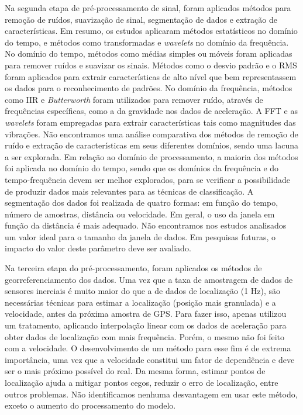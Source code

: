 Na segunda etapa de pré-processamento de sinal, foram aplicados métodos para remoção de ruídos, suavização de sinal, segmentação de dados e extração de características. Em resumo, os estudos aplicaram métodos estatísticos no domínio do tempo, e métodos como transformadas e \textit{wavelets} no domínio da frequência. No domínio do tempo, métodos como médias simples ou móveis foram aplicadas para remover ruídos e suavizar os sinais. Métodos como o desvio padrão e o RMS foram aplicados para extrair características de alto nível que bem representassem os dados para o reconhecimento de padrões. No domínio da frequência, métodos como IIR e \textit{Butterworth} foram utilizados para remover ruído, através de frequências específicas, como a da gravidade nos dados de aceleração. A FFT e as \textit{wavelets} foram empregadas para extrair características tais como magnitudes das vibrações. Não encontramos uma análise comparativa dos métodos de remoção de ruído e extração de características em seus diferentes domínios, sendo uma lacuna a ser explorada. Em relação ao domínio de processamento, a maioria dos métodos foi aplicada no domínio do tempo, sendo que os domínios da frequência e do tempo-frequência devem ser melhor explorados, para se verificar a possibilidade de produzir dados mais relevantes para as técnicas de classificação. A segmentação dos dados foi realizada de quatro formas: em função do tempo, número de amostras, distância ou velocidade. Em geral, o uso da janela em função da distância é mais adequado. Não encontramos nos estudos analisados um valor ideal para o tamanho da janela de dados. Em pesquisas futuras, o impacto do valor deste parâmetro deve ser avaliado.

Na terceira etapa do pré-processamento, foram aplicados os métodos de georreferenciamento dos dados. Uma vez que a taxa de amostragem de dados de sensores inerciais é muito maior do que a de dados de localização (1 Hz), são necessárias técnicas para estimar a localização (posição mais granulada) e a velocidade, antes da próxima amostra de GPS. Para fazer isso, apenas \cite{Li2018} utilizou um tratamento, aplicando interpolação linear com os dados de aceleração para obter dados de localização com mais frequência. Porém, o mesmo não foi feito com a velocidade. O desenvolvimento de um método para esse fim é de extrema importância, uma vez que a velocidade constitui um fator de dependência e deve ser o mais próximo possível do real. Da mesma forma, estimar pontos de localização ajuda a mitigar pontos cegos, reduzir o erro de localização, entre outros problemas. Não identificamos nenhuma desvantagem em usar este método, exceto o aumento do processamento do modelo.

